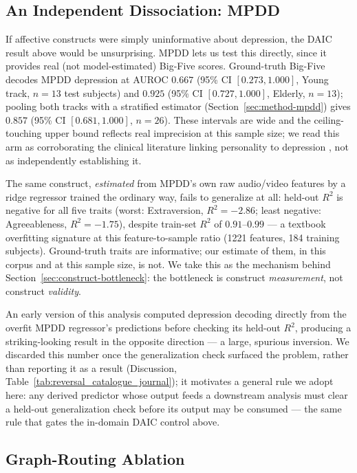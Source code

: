\documentclass[twocolumn]{article}
\begin{document}
\subsection{An Independent Dissociation: MPDD}
\label{sec:mpdd-dissociation}

If affective constructs were simply uninformative about depression, the DAIC result above would be unsurprising. MPDD \citep{fu2025mpdd} lets us test this directly, since it provides real (not model-estimated) Big-Five scores. Ground-truth Big-Five decodes MPDD depression at AUROC $0.667$ (95\% CI $[0.273, 1.000]$, Young track, $n{=}13$ test subjects) and $0.925$ (95\% CI $[0.727, 1.000]$, Elderly, $n{=}13$); pooling both tracks with a stratified estimator (Section~\ref{sec:method-mpdd}) gives $0.857$ (95\% CI $[0.681, 1.000]$, $n{=}26$). These intervals are wide and the ceiling-touching upper bound reflects real imprecision at this sample size; we read this arm as corroborating the clinical literature linking personality to depression \citep{kotov2010linking}, not as independently establishing it.

The same construct, \emph{estimated} from MPDD's own raw audio/video features by a ridge regressor trained the ordinary way, fails to generalize at all: held-out $R^2$ is negative for all five traits (worst: Extraversion, $R^2{=}-2.86$; least negative: Agreeableness, $R^2{=}-1.75$), despite train-set $R^2$ of $0.91$--$0.99$ — a textbook overfitting signature at this feature-to-sample ratio (1221 features, 184 training subjects). Ground-truth traits are informative; our estimate of them, in this corpus and at this sample size, is not. We take this as the mechanism behind Section~\ref{sec:construct-bottleneck}: the bottleneck is construct \emph{measurement}, not construct \emph{validity}.

An early version of this analysis computed depression decoding directly from the overfit MPDD regressor's predictions before checking its held-out $R^2$, producing a striking-looking result in the opposite direction — a large, spurious inversion. We discarded this number once the generalization check surfaced the problem, rather than reporting it as a result (Discussion, Table~\ref{tab:reversal_catalogue_journal}); it motivates a general rule we adopt here: any derived predictor whose output feeds a downstream analysis must clear a held-out generalization check before its output may be consumed — the same rule that gates the in-domain DAIC control above.

\subsection{Graph-Routing Ablation}
\label{sec:routing-ablation}
\end{document}
